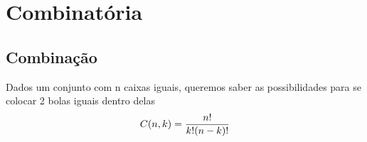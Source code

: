 \section{Combinatória}

\subsection{Combinação}
    Dados um conjunto com n caixas iguais, queremos saber as possibilidades para se colocar 2 bolas iguais dentro delas\newline
    \begin{equation}
        \centering
        C(n, k) = \frac{n!}{k!(n-k)!}
    \end{equation}
        
